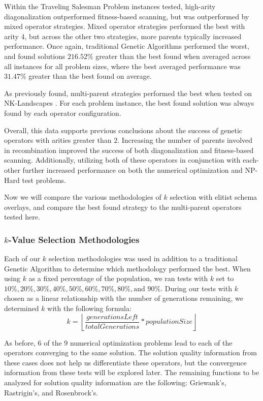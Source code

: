%
%

Within the Traveling Salesman Problem instances tested, high-arity diagonalization outperformed fitness-based scanning, but was outperformed by mixed operator strategies. Mixed operator strategies performed the best with arity 4, but across the other two strategies, more parents typically increased performance. Once again, traditional Genetic Algorithms performed the worst, and found solutions $216.52\%$ greater than the best found when averaged across all instances for all problem sizes, where the best averaged performance was $31.47\%$ greater than the best found on average.

As previously found, multi-parent strategies performed the best when tested on NK-Landscapes \cite{Eiben96}. For each problem instance, the best found solution was always found by each operator configuration.

Overall, this data supports previous conclusions about the success of genetic operators with arities greater than $2$. Increasing the number of parents involved in recombination improved the success of both diagonalization and fitness-based scanning. Additionally, utilizing both of these operators in conjunction with each-other further increased performance on both the numerical optimization and NP-Hard test problems. 

Now we will compare the various methodologies of $k$ selection with elitist schema overlays, and compare the best found strategy to the multi-parent operators tested here. 

\subsubsection*{$k$-Value Selection Methodologies}
Each of our $k$ selection methodologies was used in addition to a traditional Genetic Algorithm to determine which methodology performed the best. When using $k$ as a fixed percentage of the population, we ran tests with $k$ set to $10\%, 20\%, 30\%, 40\%, 50\%, 60\%, 70\%, 80\%,\text{and } 90\%$. During our tests with $k$ chosen as a linear relationship with the number of generations remaining, we determined $k$ with the following formula:
\[
k = \left\lfloor \frac{generationsLeft}{totalGenerations} * populationSize \right\rfloor
\]

As before, 6 of the 9 numerical optimization problems lead to each of the operators converging to the same solution. The solution quality information from these cases does not help us differentiate these operators, but the convergence information from these tests will be explored later. The remaining functions to be analyzed for solution quality information are the following: Griewank's, Rastrigin's, and Rosenbrock's.

